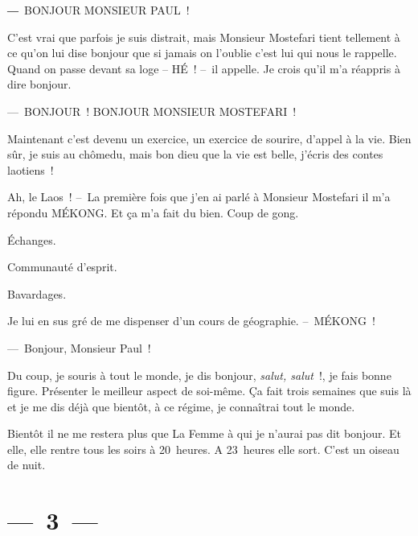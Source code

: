 \documentclass[twoside]{book} %
\begin{document}
\noindent ― BONJOUR MONSIEUR PAUL !\par
C’est vrai que parfois je suis distrait, mais Monsieur Mostefari tient tellement à ce qu’on lui dise bonjour que si jamais on l’oublie c’est lui qui nous le rappelle. Quand on passe devant sa loge – HÉ ! – il appelle. Je crois qu’il m’a réappris à dire bonjour.\par
— BONJOUR ! BONJOUR MONSIEUR MOSTEFARI !\par
Maintenant c’est devenu un exercice, un exercice de sourire, d’appel à la vie. Bien sûr, je suis au chômedu, mais bon dieu que la vie est belle, j’écris des contes laotiens !\par
Ah, le Laos ! – La première fois que j’en ai parlé à Monsieur Mostefari il m’a répondu MÉKONG. Et ça m’a fait du bien. Coup de gong.\par
Échanges.\par
Communauté d’esprit.\par
Bavardages.\par
Je lui en sus gré de me dispenser d’un cours de géographie. – MÉKONG !\par
— Bonjour, Monsieur Paul !\par
Du coup, je souris à tout le monde, je dis bonjour, \emph{salut, salut} !, je fais bonne figure. Présenter le meilleur aspect de soi-même. Ça fait trois semaines que suis là et je me dis déjà que bientôt, à ce régime, je connaîtrai tout le monde.\par
Bientôt il ne me restera plus que La Femme à qui je n’aurai pas dit bonjour. Et elle, elle rentre tous les soirs à 20 heures. A 23 heures elle sort. C’est un oiseau de nuit.

\section[{— 3 —}]{— 3 —}
\renewcommand{\leftmark}{— 3 —}
\end{document}
